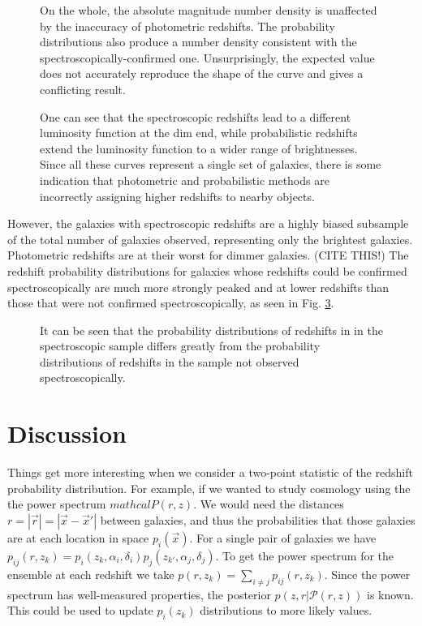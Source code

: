 \documentclass[12pt, onecolumn]{emulateapj}
\begin{document}
\begin{figure}
\caption{On the whole, the absolute magnitude number density is unaffected by the inaccuracy of photometric redshifts.  The probability distributions also produce a number density consistent with the spectroscopically-confirmed one.  Unsurprisingly, the expected value does not accurately reproduce the shape of the curve and gives a conflicting result.  \label{fig:lfs-spec}}
\end{figure}

\begin{figure}
\caption{One can see that the spectroscopic redshifts lead to a different luminosity function at the dim end, while probabilistic redshifts extend the luminosity function to a wider range of brightnesses.  Since all these curves represent a single set of galaxies, there is some indication that photometric and probabilistic methods are incorrectly assigning higher redshifts to nearby objects.   \label{fig:lfs-spec-vol}}
\end{figure}

However, the galaxies with spectroscopic redshifts are a highly biased subsample of the total number of galaxies observed, representing only the brightest galaxies.  Photometric redshifts are at their worst for dimmer galaxies.  (CITE THIS!)  The redshift probability distributions for galaxies whose redshifts could be confirmed spectroscopically are much more strongly peaked and at lower redshifts than those that were not confirmed spectroscopically, as seen in Fig. \ref{fig:zdists}.

\begin{figure}
\caption{It can be seen that the probability distributions of redshifts in in the spectroscopic sample differs greatly from the probability distributions of redshifts in the sample not observed spectroscopically.  \label{fig:zdists}}
\end{figure}

\section{Discussion}

Things get more interesting when we consider a two-point statistic of the redshift probability distribution.  For example, if we wanted to study cosmology using the the power spectrum $mathcal{P}(r,z)$.  We would need the distances $r=|\vec{r}|=|\vec{x}-\vec{x}'|$ between galaxies, and thus the probabilities that those galaxies are at each location in space $p_{i}(\vec{x})$.  For a single pair of galaxies we have $p_{ij}(r,z_{k})=p_{i}(z_{k},\alpha_{i},\delta_{i})p_{j}(z_{k'},\alpha_{j},\delta_{j})$.  To get the power spectrum for the ensemble at each redshift we take $p(r,z_{k})=\sum_{i\neq j}p_{ij}(r,z_{k})$.  Since the power spectrum has well-measured properties, the posterior $p(z,r|\mathcal{P}(r,z))$ is known.  This could be used to update $p_{i}(z_{k})$ distributions to more likely values.  
\end{document}
